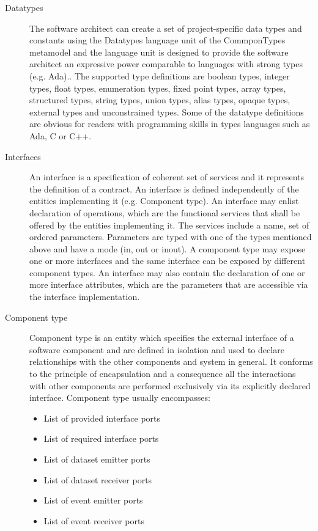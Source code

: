 \begin{description}
\item [Datatypes] The software architect can create a set of project-specific data types and constants using the Datatypes language unit of the CommponTypes metamodel and the language unit is designed to provide the software architect an expressive power comparable to languages with strong types (e.g. Ada).\cite{SpecMetamodel}. The supported type definitions are boolean types, integer types, float types, enumeration types, fixed point types, array types, structured types, string types, union types, alias types, opaque types, external types and unconstrained types. Some of the datatype definitions are obvious for readers with programming skills in types languages such as Ada, C or C++. 

\item [Interfaces] An interface is a specification of coherent set of services and it represents the definition of a contract. An interface is defined independently of the entities implementing it (e.g. Component type). An interface may enlist declaration of operations, which are the functional services that shall be offered by the entities implementing it. The services include a name, set of ordered parameters. Parameters are typed with one of the types mentioned above and have a mode (in, out or inout). A component type may expose one or more interfaces and the same interface can be exposed by different component types. An interface may also contain the declaration of one or more interface attributes, which are the parameters that are accessible via the interface implementation.

\item [Component type] Component type is an entity which specifies the external interface of a software component and are defined in isolation and used to declare relationships with the other components and system in general. It conforms to the principle of encapsulation and a consequence all the interactions with other components are performed exclusively via its explicitly declared interface. Component type usually encompasses:
\begin{itemize}
\item List of provided interface ports
\item List of required interface ports
\item List of dataset emitter ports 
\item List of dataset receiver ports
\item List of event emitter ports
\item List of event receiver ports 
\end{itemize}


\end{description}
